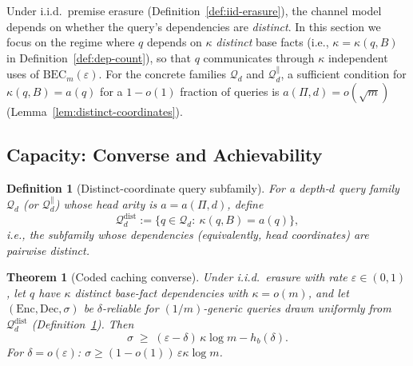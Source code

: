 \documentclass[journal]{IEEEtran}
\newtheorem{theorem}{Theorem}[section]
\newtheorem{definition}{Definition}[section]
\numberwithin{equation}{section}
\begin{document}
Under i.i.d.\ premise erasure (Definition~\ref{def:iid-erasure}), the channel
model depends on whether the query's dependencies are \emph{distinct}.
In this section we focus on the regime where \(q\) depends on \(\kappa\)
\emph{distinct} base facts (i.e., \(\kappa=\kappa(q,B)\) in
Definition~\ref{def:dep-count}), so that \(q\) communicates through \(\kappa\)
independent uses of \(\mathrm{BEC}_m(\varepsilon)\).
For the concrete families \(\mathcal Q_d\) and \(\mathcal Q_d^{\parallel}\),
a sufficient condition for \(\kappa(q,B)=a(q)\) for a \(1-o(1)\) fraction of
queries is \(a(\Pi,d)=o(\sqrt m)\) (Lemma~\ref{lem:distinct-coordinates}).

\subsection{Capacity: Converse and Achievability}
\label{subsec:capacity-converse-achiev}

\begin{definition}[Distinct-coordinate query subfamily]
\label{def:distinct-subfamily}
For a depth-\(d\) query family \(\mathcal Q_d\) (or \(\mathcal Q_d^{\parallel}\))
whose head arity is \(a=a(\Pi,d)\), define
\[
  \mathcal Q_d^{\mathrm{dist}}
  :=\{q\in\mathcal Q_d:\ \kappa(q,B)=a(q)\},
\]
i.e., the subfamily whose dependencies (equivalently, head coordinates) are
pairwise distinct.
\end{definition}

\begin{theorem}[Coded caching converse]
\label{thm:coded-converse}
Under i.i.d.\ erasure with rate $\varepsilon\in(0,1)$, let
$q$ have $\kappa$ distinct base-fact dependencies
with $\kappa=o(m)$, and let
$(\mathrm{Enc},\mathrm{Dec},\sigma)$ be $\delta$-reliable
for $(1/m)$-generic queries drawn uniformly from
\(\mathcal Q_d^{\mathrm{dist}}\) (Definition~\ref{def:distinct-subfamily}).
Then
\begin{equation}\label{eq:coded-converse}
  \sigma
  \;\ge\;
  (\varepsilon-\delta)\,\kappa\log m-h_b(\delta).
\end{equation}
For $\delta=o(\varepsilon)$:
$\sigma\ge(1{-}o(1))\,\varepsilon\kappa\log m$.
\end{theorem}
\end{document}
